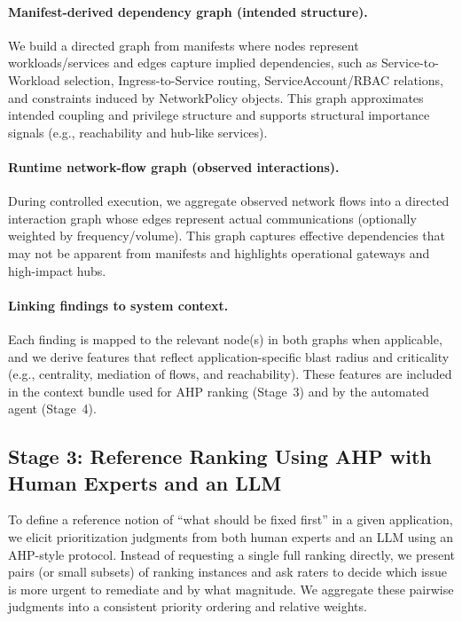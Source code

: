 \documentclass[12pt]{article}
\begin{document}
\paragraph{Manifest-derived dependency graph (intended structure).}
We build a directed graph from manifests where nodes represent workloads/services and edges capture implied dependencies, such as Service-to-Workload selection, Ingress-to-Service routing, ServiceAccount/RBAC relations, and constraints induced by NetworkPolicy objects. This graph approximates intended coupling and privilege structure and supports structural importance signals (e.g., reachability and hub-like services).

\paragraph{Runtime network-flow graph (observed interactions).}
During controlled execution, we aggregate observed network flows into a directed interaction graph whose edges represent actual communications (optionally weighted by frequency/volume). This graph captures effective dependencies that may not be apparent from manifests and highlights operational gateways and high-impact hubs.

\paragraph{Linking findings to system context.}
Each finding is mapped to the relevant node(s) in both graphs when applicable, and we derive features that reflect application-specific blast radius and criticality (e.g., centrality, mediation of flows, and reachability). These features are included in the context bundle used for AHP ranking (Stage~3) and by the automated agent (Stage~4).


\subsection{Stage 3: Reference Ranking Using AHP with Human Experts and an LLM}
\label{subsec:stage3}

To define a reference notion of ``what should be fixed first'' in a given application, we elicit prioritization judgments from both human experts and an LLM using an AHP-style protocol. Instead of requesting a single full ranking directly, we present pairs (or small subsets) of ranking instances and ask raters to decide which issue is more urgent to remediate and by what magnitude. We aggregate these pairwise judgments into a consistent priority ordering and relative weights.
\end{document}
